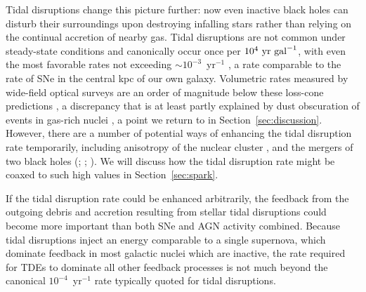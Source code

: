 \documentclass[preprint2]{aastex}
\begin{document}
Tidal disruptions change this picture further: now even inactive black holes can disturb their surroundings upon destroying infalling stars rather than relying on the continual accretion of nearby gas. Tidal disruptions are not common under steady-state conditions and canonically occur once per $10^{4}~{\rm yr~gal}^{-1}$, with even the most favorable rates not exceeding $\sim 10^{-3}$~yr$^{-1}$ \citep{Magorrian:1999a,Wang:2004a,Stone:2016a,Stone:2020a}, a rate comparable to the rate of SNe in the central kpc of our own galaxy. Volumetric rates measured by wide-field optical surveys are an order of magnitude below these loss-cone predictions \citep{vanVelzen:2021a,Hammerstein:2023a,Yao:2023a}, a discrepancy that is at least partly explained by dust obscuration of events in gas-rich nuclei \citep{Masterson:2024a}, a point we return to in Section~\ref{sec:discussion}. However, there are a number of potential ways of enhancing the tidal disruption rate temporarily, including anisotropy of the nuclear cluster \citep{Merritt:2004a,Lezhnin:2016a}, and the mergers of two black holes (\citealt{Chen:2011a}; ; ). We will discuss how the tidal disruption rate might be coaxed to such high values in Section~\ref{sec:spark}.

If the tidal disruption rate could be enhanced arbitrarily, the feedback from the outgoing debris and accretion resulting from stellar tidal disruptions could become more important than both SNe and AGN activity combined. Because tidal disruptions inject an energy comparable to a single supernova, which dominate feedback in most galactic nuclei which are inactive, the rate required for TDEs to dominate all other feedback processes is not much beyond the canonical $10^{-4}$~yr$^{-1}$ rate typically quoted for tidal disruptions.
\end{document}

